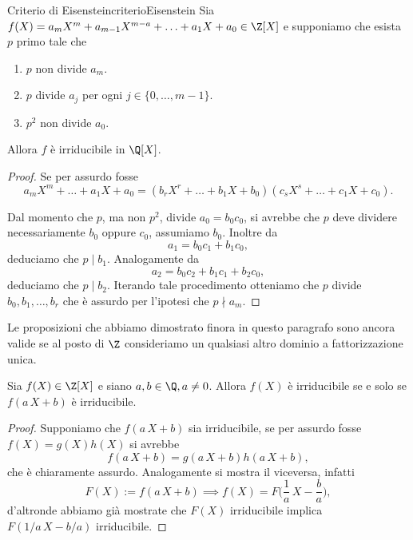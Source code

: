 \begin{prop}{Criterio di Eisenstein}{criterioEisenstein}
	Sia \(f(X) = a_m X^m+a_{m-1}X^{m-a} + \ldots + a_1 X + a_0 \in \Z[X]\) e supponiamo che esista \(p\) primo tale che
	\begin{enumerate}
		\item \(p\) non divide \(a_m\).
		\item \(p\) divide \(a_j\) per ogni \(j\in\{0,\ldots,m-1\}\).
		\item \(p^2\) non divide \(a_0\).
	\end{enumerate}
	Allora \(f\) è irriducibile in \(\Q[X]\).
\end{prop}

\begin{proof}
	Se per assurdo fosse
	\[
		a_m X^m + \ldots + a_1 X + a_0 = (b_r X^r + \ldots + b_1 X+b_0)(c_s X^s + \ldots + c_1 X + c_0).
	\]

	Dal momento che \(p\), ma non \(p^2\), divide \(a_0=b_0 c_0\), si avrebbe che \(p\) deve dividere necessariamente \(b_0\) oppure \(c_0\), assumiamo \(b_0\). Inoltre da
	\[
		a_1 = b_0 c_1+ b_1 c_0,
	\]
	deduciamo che \(p\mid b_1\). Analogamente da
	\[
		a_2 = b_0 c_2 + b_1 c_1 + b_2 c_0,
	\]
	deduciamo che \(p\mid b_2\).
	Iterando tale procedimento otteniamo che \(p\) divide \(b_0,b_1,\ldots,b_r\) che è assurdo per l'ipotesi che \(p\nmid a_m\).
\end{proof}

\begin{oss}
	Le proposizioni che abbiamo dimostrato finora in questo paragrafo sono ancora valide se al posto di \(\Z\) consideriamo un qualsiasi altro dominio a fattorizzazione unica.
\end{oss}

\begin{pr}
	Sia \(f(X)\in \Z[X]\) e siano \(a,b\in \Q,a\neq 0\). Allora \(f(X)\) è irriducibile se e solo se \(f(a\,X+b)\) è irriducibile.
\end{pr}

\begin{proof}
	Supponiamo che \(f(a\,X+b)\) sia irriducibile, se per assurdo fosse \(f(X)=g(X)h(X)\) si avrebbe
	\[
		f(a\,X+b) = g(a\,X+b)h(a\,X+b),
	\]
	che è chiaramente assurdo.
	Analogamente si mostra il viceversa, infatti
	\[
		F(X):=f(a\,X+b) \implies f(X) = F \Big(\frac{1}{a}\,X- \frac{b}{a}\Big),
	\]
	d'altronde abbiamo già mostrate che \(F(X)\) irriducibile implica \(F(1/a\,X-b/a)\) irriducibile.
\end{proof}

